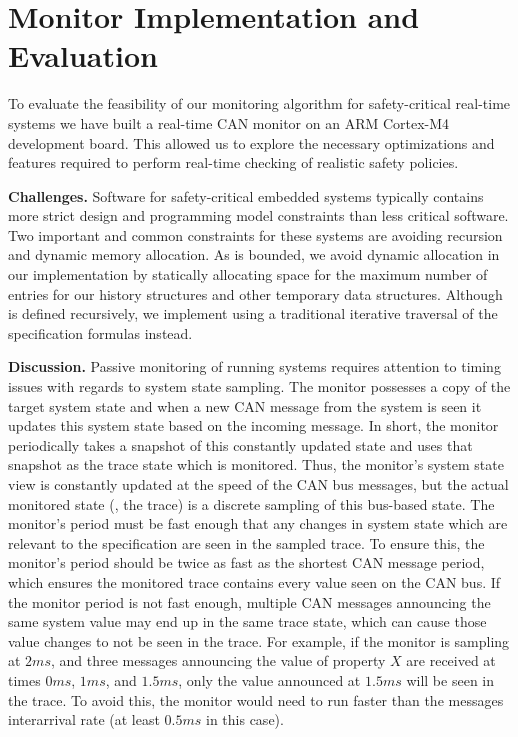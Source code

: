 
\section{Monitor Implementation and Evaluation}
\label{sec:implementation}

To evaluate the feasibility of our monitoring algorithm for safety-critical
real-time systems we have built a real-time CAN monitor on an ARM Cortex-M4
development board. This allowed us to explore the necessary optimizations and
features required to perform real-time checking of realistic safety policies.


\noindent\textbf{Challenges. }
Software for safety-critical embedded systems typically contains more strict
design and programming model constraints than less critical software. Two
important and common constraints for these systems are avoiding recursion  and
 dynamic memory allocation.
As \planguage is bounded, we avoid dynamic allocation
in our \monitor implementation by statically allocating space for the maximum
number of entries for our history structures and other temporary data structures.
Although \monitor is defined recursively,
we  implement \monitor using a traditional iterative traversal
of the specification formulas instead.

\noindent\textbf{Discussion. }
Passive monitoring of running systems requires attention to timing issues with regards to system state sampling.
%
The monitor possesses a copy of the target system state and
when a new CAN message from the system is seen it updates this
system state based on the incoming message. In short, the monitor periodically
takes a snapshot of this constantly updated state and uses that snapshot
as the trace state which is monitored.
%
Thus, the monitor's system state view is constantly updated at the speed of the CAN bus messages, but the actual monitored state (\ie, the trace) is a discrete sampling of this bus-based state.
The monitor's period must be fast enough that any changes in system state which are relevant to the specification are seen in the sampled trace.
To ensure this, the monitor's period should be twice as fast as the shortest CAN message period, which ensures the monitored trace contains every value seen on the CAN bus.
If the monitor period is not fast enough, multiple CAN messages announcing the same system value may end up in the same trace state, which can cause those value changes to not be seen in the trace.
For example, if the monitor is sampling at $2ms$, and three messages announcing the value of property $X$ are received at times $0ms$, $1ms$, and $1.5ms$, only the value announced at $1.5ms$ will be seen in the trace. To avoid this, the monitor would need to run faster than the messages interarrival rate (at least $0.5ms$ in this case).


